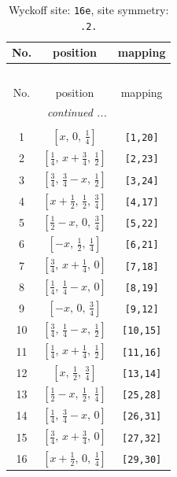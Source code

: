 \documentclass[fleqn,8pt]{jsarticle}
\begin{document}
\renewcommand{\arraystretch}{1.2}
\begin{longtable}{ccc}
\caption{Wyckoff site: {\tt 16e}, site symmetry: {\tt .2.}}
 \\
 \hline \hline
No. & position & mapping \\ \hline \endfirsthead

\multicolumn{2}{l}{\tablename\ \thetable{}} \\
 \hline \hline
No. & position & mapping \\ \hline \endhead

 \hline \hline
\multicolumn{2}{r}{\footnotesize\it continued ...} \\ \endfoot

 \hline \hline
\multicolumn{2}{r}{} \\ \endlastfoot

1 & $\left[ x,\, 0,\, \frac{1}{4} \right]$ & {\tt [1,20]} \\ \hline
2 & $\left[ \frac{1}{4},\, x + \frac{3}{4},\, \frac{1}{2} \right]$ & {\tt [2,23]} \\ \hline
3 & $\left[ \frac{3}{4},\, \frac{3}{4} - x,\, \frac{1}{2} \right]$ & {\tt [3,24]} \\ \hline
4 & $\left[ x + \frac{1}{2},\, \frac{1}{2},\, \frac{3}{4} \right]$ & {\tt [4,17]} \\ \hline
5 & $\left[ \frac{1}{2} - x,\, 0,\, \frac{3}{4} \right]$ & {\tt [5,22]} \\ \hline
6 & $\left[ - x,\, \frac{1}{2},\, \frac{1}{4} \right]$ & {\tt [6,21]} \\ \hline
7 & $\left[ \frac{3}{4},\, x + \frac{1}{4},\, 0 \right]$ & {\tt [7,18]} \\ \hline
8 & $\left[ \frac{1}{4},\, \frac{1}{4} - x,\, 0 \right]$ & {\tt [8,19]} \\ \hline
9 & $\left[ - x,\, 0,\, \frac{3}{4} \right]$ & {\tt [9,12]} \\ \hline
10 & $\left[ \frac{3}{4},\, \frac{1}{4} - x,\, \frac{1}{2} \right]$ & {\tt [10,15]} \\ \hline
11 & $\left[ \frac{1}{4},\, x + \frac{1}{4},\, \frac{1}{2} \right]$ & {\tt [11,16]} \\ \hline
12 & $\left[ x,\, \frac{1}{2},\, \frac{3}{4} \right]$ & {\tt [13,14]} \\ \hline
13 & $\left[ \frac{1}{2} - x,\, \frac{1}{2},\, \frac{1}{4} \right]$ & {\tt [25,28]} \\ \hline
14 & $\left[ \frac{1}{4},\, \frac{3}{4} - x,\, 0 \right]$ & {\tt [26,31]} \\ \hline
15 & $\left[ \frac{3}{4},\, x + \frac{3}{4},\, 0 \right]$ & {\tt [27,32]} \\ \hline
16 & $\left[ x + \frac{1}{2},\, 0,\, \frac{1}{4} \right]$ & {\tt [29,30]} \\
\end{longtable}
\end{document}
